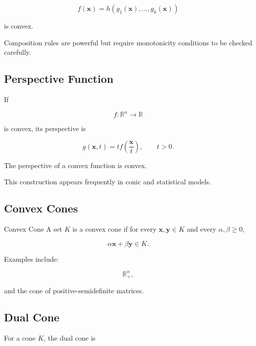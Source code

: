 \[
\boxed{
f(\mathbf{x})
=
h
(
g_1(\mathbf{x}),
\ldots,
g_k(\mathbf{x})
)
}
\]

is convex.

Composition rules are powerful but require monotonicity conditions to be
checked carefully.

\subsection{Perspective Function}
\label{subsec:perspective-function}

If

\[
f:\mathbb{R}^n\to\mathbb{R}
\]

is convex, its perspective is

\[
\boxed{
g(\mathbf{x},t)
=
t
f
\left(
\frac{\mathbf{x}}{t}
\right),
\qquad
t>0.
}
\]

The perspective of a convex function is convex.

This construction appears frequently in conic and statistical models.

\subsection{Convex Cones}
\label{subsec:convex-cones}

\begin{definitionbox}{Convex Cone}
A set \(K\) is a convex cone if for every
\(\mathbf{x},\mathbf{y}\in K\) and every
\(\alpha,\beta\geq0\),

\[
\boxed{
\alpha\mathbf{x}
+
\beta\mathbf{y}
\in K.
}
\]
\end{definitionbox}

Examples include:

\[
\boxed{
\mathbb{R}_+^n,
}
\]

and the cone of positive-semidefinite matrices.

\subsection{Dual Cone}
\label{subsec:dual-cone}

For a cone \(K\), the dual cone is

